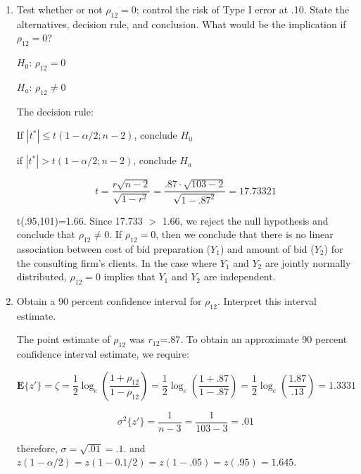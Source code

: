 \documentclass{article}
\begin{document}
\begin{enumerate}[label=(\alph*)]

\item Test whether or not $\rho_{12}=0$; control the risk of Type I error at .10. State the alternatives, decision rule, and conclusion. What would be the implication if $\rho_{12}=0$?
\begin{center}
$H_{0}$: $\rho_{12}=0$

$H_{a}$: $\rho_{12} \neq 0$
\end{center}

The decision rule: 

\begin{center}
If $|t^*| \leq t(1-\alpha/2; n-2)$, conclude $H_{0}$

if $|t^*|> t(1-\alpha/2; n-2)$, conclude $H_{a}$
\end{center}

\begin{equation}
t=\frac{r\sqrt{n-2}}{\sqrt{1-r^2}}=\frac{.87\cdot\sqrt{103-2}}{\sqrt{1-.87^2}}=17.73321
\end{equation}

t(.95,101)=1.66. Since 17.733 $>$ 1.66, we reject the null hypothesis and conclude that $\rho_{12} \neq 0$. If $\rho_{12}=0$, then we conclude that there is no linear association between cost of bid preparation (\emph{$Y_{1}$}) and amount of bid (\emph{$Y_{2}$}) for the consulting firm's clients. In the case where $Y_{1}$ and $Y_{2}$ are jointly normally distributed, $\rho_{12}=0$ implies that $Y_{1}$ and $Y_{2}$ are independent.

\item Obtain a 90 percent confidence interval for $\rho_{12}$. Interpret this interval estimate.

The point estimate of $\rho_{12}$ was $r_{12}$=.87. To obtain an approximate 90 percent confidence interval estimate, we require:

\begin{equation}
\mathbf{E}\{z'\}=\zeta=\frac{1}{2}\log_{e}(\frac{1+\rho_{12}}{1-\rho_{12}})=\frac{1}{2}\log_{e}(\frac{1+.87}{1-.87})=\frac{1}{2}\log_e(\frac{1.87}{.13})=1.3331
\end{equation}

\begin{equation}
\sigma^2\{z'\}=\frac{1}{n-3}=\frac{1}{103-3}=.01
\end{equation}

therefore, $\sigma=\sqrt{.01}=.1$. and $z(1-\alpha/2)=z(1-0.1/2)=z(1-.05)=z(.95)=1.645$.


\end{enumerate}
\end{document}
